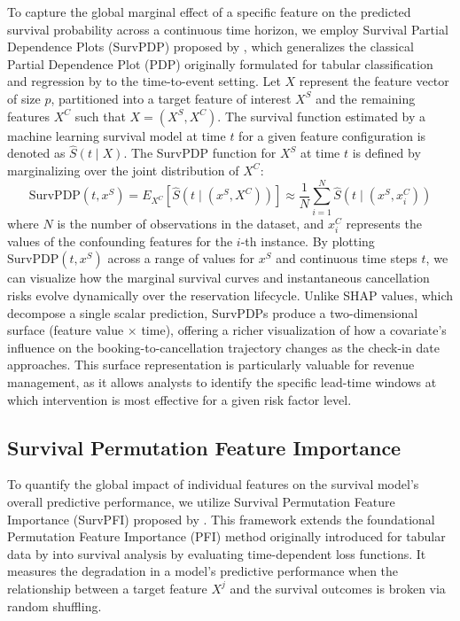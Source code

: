 \documentclass[pdflatex,sn-mathphys-ay]{sn-jnl}
\theoremstyle{thmstyleone}%
\theoremstyle{thmstyletwo}%
\theoremstyle{thmstylethree}%
\begin{document}
To capture the global marginal effect of a specific feature on the predicted survival probability across a continuous time horizon, we employ Survival Partial Dependence Plots (SurvPDP) proposed by \cite{langbein2025interpretable}, which generalizes the classical Partial Dependence Plot (PDP) originally formulated for tabular classification and regression by \cite{friedman2001greedy} to the time-to-event setting. Let $X$ represent the feature vector of size $p$, partitioned into a target feature of interest $X^S$ and the remaining features $X^C$ such that $X = (X^S, X^C)$. The survival function estimated by a machine learning survival model at time $t$ for a given feature configuration is denoted as $\hat{S}(t \mid X)$. The SurvPDP function for $X^S$ at time $t$ is defined by marginalizing over the joint distribution of $X^C$:
\begin{equation}
\text{SurvPDP}(t, x^S) = E_{X^C} \left[ \hat{S}(t \mid (x^S, X^C)) \right] \approx \frac{1}{N} \sum_{i=1}^N \hat{S}\left(t \mid (x^S, x_i^C)\right)
\end{equation}
where $N$ is the number of observations in the dataset, and $x_i^C$ represents the values of the confounding features for the $i$-th instance. By plotting $\text{SurvPDP}(t, x^S)$ across a range of values for $x^S$ and continuous time steps $t$, we can visualize how the marginal survival curves and instantaneous cancellation risks evolve dynamically over the reservation lifecycle. Unlike SHAP values, which decompose a single scalar prediction, SurvPDPs produce a two-dimensional surface (feature value × time), offering a richer visualization of how a covariate's influence on the booking-to-cancellation trajectory changes as the check-in date approaches. This surface representation is particularly valuable for revenue management, as it allows analysts to identify the specific lead-time windows at which intervention is most effective for a given risk factor level.

\subsection{Survival Permutation Feature Importance}

To quantify the global impact of individual features on the survival model's overall predictive performance, we utilize Survival Permutation Feature Importance (SurvPFI) proposed by \cite{langbein2025interpretable}. This framework extends the foundational Permutation Feature Importance (PFI) method originally introduced for tabular data by \cite{breiman2001random} into survival analysis by evaluating time-dependent loss functions. It measures the degradation in a model's predictive performance when the relationship between a target feature $X^j$ and the survival outcomes is broken via random shuffling.
\end{document}
